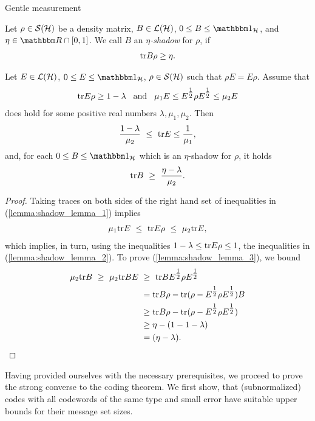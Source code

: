\begin{subsubsection}{Gentle measurement}
	\begin{definition}[Shadow]
	Let $\rho \in {\mathcal S}({\mathcal H})$ be a density matrix, $B \in {\mathcal L}({\mathcal H})$, $0 \leq B \leq \bbmeins_\cH$, and $\eta \in \bbmR \cap [0,1]$. We call $B$ an \emph{$\eta$-shadow} for
	$\rho$, if 
	\begin{align}
	 \mathrm{tr} B \rho \geq \eta.
	\end{align}
	\end{definition}
	\begin{lemma} \label{lemma:shadow_lemma}
	 Let $E \in {\mathcal L}({\mathcal H})$, $0 \leq E \leq \bbmeins_\cH$, $\rho \in {\mathcal S}({\mathcal H})$ such that $\rho E = E \rho$. Assume that
	 \begin{align}
	  \mathrm{tr} E \rho \geq 1 - \lambda \hspace{.3cm} \text{and} \hspace{.3cm} \mu_1 E \leq  E^{\tfrac{1}{2}} \rho E^{\tfrac{1}{2}} \leq \mu_2 E  \label{lemma:shadow_lemma_1}
	 \end{align}
	does hold for some positive real numbers $\lambda, \mu_1, \mu_2$. Then
	\begin{align}
	 \frac{1- \lambda}{\mu_2} \ \leq \ \mathrm{tr} E \leq \frac{1}{\mu_1}, \label{lemma:shadow_lemma_2}
	\end{align}
        and, for each $0 \leq B \leq \bbmeins_\cH$ which is an $\eta$-shadow for $\rho$, it holds
        \begin{align}
         \mathrm{tr} B \ \geq \ \frac{\eta - \lambda}{\mu_2}. \label{lemma:shadow_lemma_3}
        \end{align}
	\end{lemma}
        \begin{proof}
        Taking traces on both sides of the right hand set of inequalities in (\ref{lemma:shadow_lemma_1}) implies
        \begin{align}
         \mu_1 \mathrm{tr} E \ \leq \ \mathrm{tr} E \rho \ \leq \ \mu_2 \mathrm{tr} E,
        \end{align}
	which implies, in turn, using the inequalities $1 - \lambda \leq \mathrm{tr} E \rho \leq 1$, the inequalities in (\ref{lemma:shadow_lemma_2}). To prove (\ref{lemma:shadow_lemma_3}), we 
	bound
	\begin{align}
	 \mu_2 \tr B \ \geq \ \mu_2 \tr BE \ 
	 & \geq \  \tr B E^{\tfrac{1}{2}} \rho E^{\tfrac{1}{2}} \\
	 & = \tr B \rho - \tr (\rho - E^{\tfrac{1}{2}}\rho E^{\tfrac{1}{2}}) B \\
	 & \geq  \tr B \rho - \tr(\rho - E^{\tfrac{1}{2}}\rho E^{\tfrac{1}{2}}) \\
	 & \geq \eta - (1 - 1 - \lambda)  \\
	 & = (\eta - \lambda).
	\end{align}
	\end{proof}
	Having provided ourselves with the necessary prerequisites, we proceed to prove the strong converse to the coding theorem. We first show, that (subnormalized) codes with all codewords of the same type 
	and small error have suitable upper bounds for their message set sizes. 
	

\end{subsubsection}

